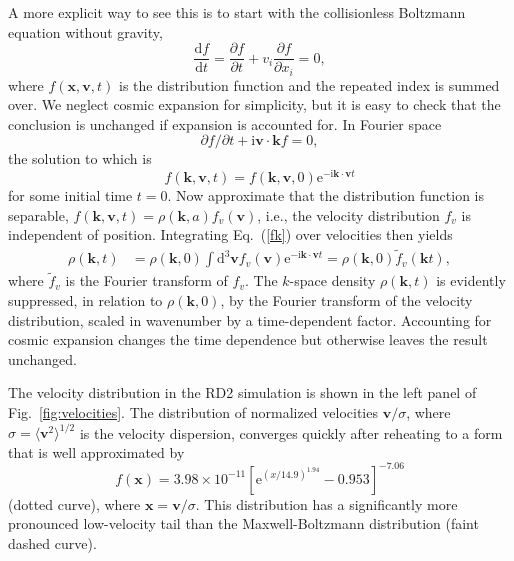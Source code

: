 \documentclass[a4paper,11pt]{article}
\let\vec\bm%
\newcommand{\diff}{\ensuremath{\mathrm{d}}}
\newcommand{\e}{\mathrm{e}}
\newcommand{\I}{\mathrm{i}}
\begin{document}
A more explicit way to see this is to start with the collisionless Boltzmann equation without gravity,
\begin{equation}\label{CBE}
    \frac{\diff f}{\diff t}=\frac{\partial f}{\partial t}+v_i\frac{\partial f}{\partial x_i}=0,
\end{equation}
where $f(\vec x, \vec v, t)$ is the distribution function and the repeated index is summed over. We neglect cosmic expansion for simplicity, but it is easy to check that the conclusion is unchanged if expansion is accounted for. In Fourier space
\begin{equation}\label{CBEk}
    \partial f/\partial t+\I\vec v\cdot\vec k f=0,
\end{equation}
the solution to which is
\begin{equation}\label{fk}
    f(\vec k,\vec v,t) = f(\vec k,\vec v,0)\e^{-\I\vec k\cdot\vec v t}
\end{equation}
for some initial time $t=0$.
Now approximate that the distribution function is separable,
$f(\vec k,\vec v,t) = \rho(\vec k,a) f_v(\vec v)$,
i.e., the velocity distribution $f_v$ is independent of position.
Integrating Eq.~(\ref{fk}) over velocities then yields
\begin{align}\label{fk2}
    \rho(\vec k,t)
    &=
    \rho(\vec k,0)\int\diff^3\vec v f_v(\vec v)\e^{-\I\vec k\cdot\vec v t}
    =
    \rho(\vec k,0)\tilde f_v(\vec k t),
\end{align}
where $\tilde f_v$ is the Fourier transform of $f_v$.
The $k$-space density $\rho(\vec k,t)$ is evidently suppressed, in relation to $\rho(\vec k,0)$, by the Fourier transform of the velocity distribution, scaled in wavenumber by a time-dependent factor. Accounting for cosmic expansion changes the time dependence but otherwise leaves the result unchanged.

The velocity distribution in the RD2 simulation is shown in the left panel of Fig.~\ref{fig:velocities}. The distribution of normalized velocities $\vec v/\sigma$, where $\sigma=\langle\vec v^2\rangle^{1/2}$ is the velocity dispersion, converges quickly after reheating to a form that is well approximated by
\begin{equation}\label{vdistfit}
    f(\vec x)=3.98\times 10^{-11} \left[\e^{(x/14.9)^{1.94}}-0.953\right]^{-7.06}
\end{equation}
(dotted curve), where $\vec x=\vec v/\sigma$. This distribution has a significantly more pronounced low-velocity tail than the Maxwell-Boltzmann distribution (faint dashed curve).
\end{document}
